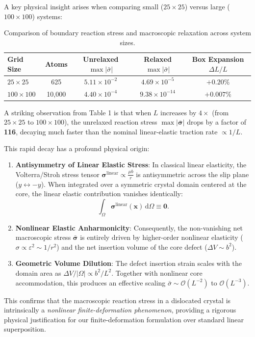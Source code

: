 \documentclass[11pt,a4paper]{article}
\begin{document}
A key physical insight arises when comparing small ($25 \times 25$) versus large ($100 \times 100$) systems:
\begin{table}[h!]
\centering
\small
\setlength{\tabcolsep}{6pt}
\begin{tabular}{lcccc}
\toprule
\textbf{Grid Size} & \textbf{Atoms} & \textbf{Unrelaxed $\max|\bar{\sigma}|$} & \textbf{Relaxed $\max|\bar{\sigma}|$} & \textbf{Box Expansion $\Delta L / L$} \\
\midrule
$25 \times 25$   & 625    & $5.11 \times 10^{-2}$  & $4.69 \times 10^{-5}$  & $+0.20\%$ \\
$100 \times 100$ & 10,000 & $4.40 \times 10^{-4}$  & $9.38 \times 10^{-14}$ & $+0.007\%$ \\
\bottomrule
\end{tabular}
\caption{Comparison of boundary reaction stress and macroscopic relaxation across system sizes.}
\end{table}

\begin{infobox}
A striking observation from Table 1 is that when $L$ increases by $4\times$ (from $25 \times 25$ to $100 \times 100$), the unrelaxed reaction stress $\max|\bar{\boldsymbol{\sigma}}|$ drops by a factor of \textbf{116}, decaying much faster than the nominal linear-elastic traction rate $\propto 1/L$.

This rapid decay has a profound physical origin:
\begin{enumerate}
    \item \textbf{Antisymmetry of Linear Elastic Stress}: In classical linear elasticity, the Volterra/Stroh stress tensor $\boldsymbol{\sigma}^{\text{linear}} \propto \frac{\mu b}{r}$ is antisymmetric across the slip plane ($y \leftrightarrow -y$). When integrated over a symmetric crystal domain centered at the core, the linear elastic contribution vanishes identically:
    $$\int_{\Omega} \boldsymbol{\sigma}^{\text{linear}}(\mathbf{x}) \, \mathrm{d}\Omega \equiv \mathbf{0}.$$
    \item \textbf{Nonlinear Elastic Anharmonicity}: Consequently, the non-vanishing net macroscopic stress $\bar{\boldsymbol{\sigma}}$ is entirely driven by higher-order nonlinear elasticity ($\sigma \propto \varepsilon^2 \sim 1/r^2$) and the net insertion volume of the core defect ($\Delta V \sim b^2$).
    \item \textbf{Geometric Volume Dilution}: The defect insertion strain scales with the domain area as $\Delta V / |\Omega| \propto b^2 / L^2$. Together with nonlinear core accommodation, this produces an effective scaling $\bar{\sigma} \sim \mathcal{O}(L^{-2})$ to $\mathcal{O}(L^{-3})$.
\end{enumerate}
This confirms that the macroscopic reaction stress in a dislocated crystal is intrinsically a \emph{nonlinear finite-deformation phenomenon}, providing a rigorous physical justification for our finite-deformation formulation over standard linear superposition.
\end{infobox}
\end{document}

